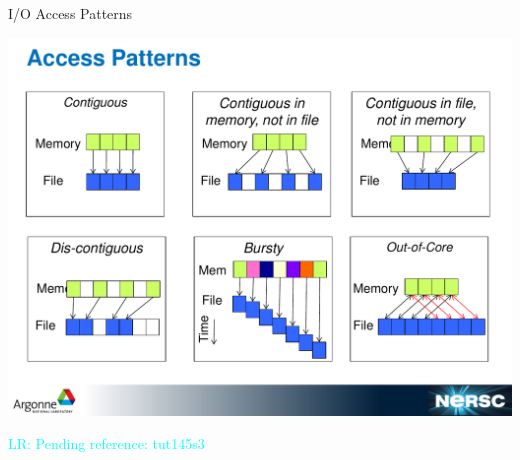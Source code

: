 \documentclass[compress,11pt,xcolor=svgnames,aspectratio=169]{beamer}
\newcommand{\lr}[1]{\textcolor{cyan}{LR: #1}}
\begin{document}
\begin{frame}[fragile]{I/O Access Patterns}

\begin{center}
\includegraphics[scale=0.35]{io-patterns}
\end{center}

\lr{Pending reference: tut145s3}

\end{frame}
\end{document}
